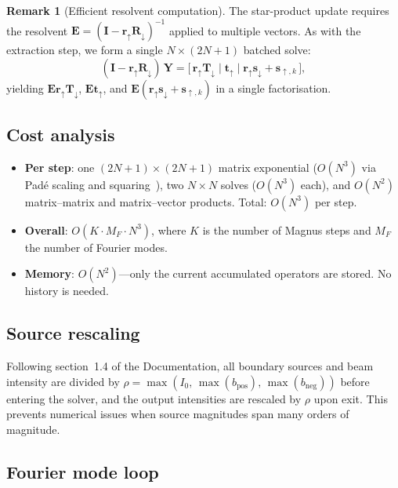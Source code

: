\documentclass[11pt,a4paper]{article}
\newcommand{\vect}[1]{\bm{#1}}
\newcommand{\mat}[1]{\mathbf{#1}}
\theoremstyle{definition}
\newtheorem{remark}{Remark}
\begin{document}
\begin{remark}[Efficient resolvent computation]
The star-product update requires the resolvent
$\mat{E}=(\mat{I}-\mat{r}_\uparrow\mat{R}_\downarrow)^{-1}$
applied to multiple vectors.  As with the extraction step, we
form a single $N\!\times\!(2N\!+\!1)$ batched solve:
\begin{equation}\label{eq:batched_star}
  (\mat{I}-\mat{r}_\uparrow\mat{R}_\downarrow)\,\mat{Y}
  = \bigl[\,\mat{r}_\uparrow\mat{T}_\downarrow
    \;\big|\; \mat{t}_\uparrow
    \;\big|\; \mat{r}_\uparrow\vect{s}_\downarrow
              + \vect{s}_{\uparrow,k}\,\bigr],
\end{equation}
yielding $\mat{E}\mat{r}_\uparrow\mat{T}_\downarrow$,
$\mat{E}\mat{t}_\uparrow$, and
$\mat{E}(\mat{r}_\uparrow\vect{s}_\downarrow+\vect{s}_{\uparrow,k})$
in a single factorisation.
\end{remark}

\subsection{Cost analysis}

\begin{itemize}[nosep]
\item \textbf{Per step}: one $(2N\!+\!1)\!\times\!(2N\!+\!1)$ matrix
  exponential ($O(N^3)$ via Pad\'e scaling and
  squaring~\cite{higham2005,moler2003}), two $N\!\times\!N$ solves
  ($O(N^3)$ each), and $O(N^2)$ matrix--matrix and matrix--vector
  products.  Total: $O(N^3)$ per step.
\item \textbf{Overall}: $O(K\cdot M_F\cdot N^3)$, where $K$ is the
  number of Magnus steps and $M_F$ the number of Fourier modes.
\item \textbf{Memory}: $O(N^2)$---only the current accumulated
  operators are stored.  No history is needed.
\end{itemize}

\subsection{Source rescaling}

Following section~1.4 of the Documentation, all boundary sources
and beam intensity are divided by
$\rho=\max(I_0,\,\max(b_{\text{pos}}),\,\max(b_{\text{neg}}))$
before entering the solver, and the output intensities are rescaled
by $\rho$ upon exit.  This prevents numerical issues when source
magnitudes span many orders of magnitude.

\subsection{Fourier mode loop}
\end{document}
